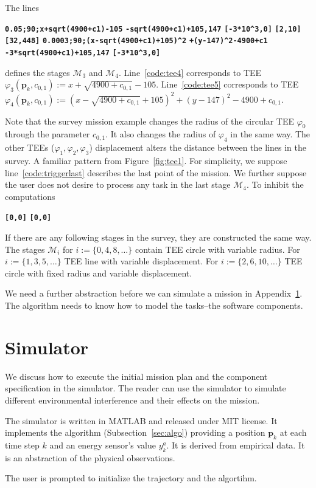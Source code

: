 \documentclass[letterpaper,10pt,conference]{ieeeconf}
\theoremstyle{definition}
\begin{document}
The lines
\begin{algorithmic}[1]
  \State\textbf{\texttt{0.05;90;x+sqrt(4900+c1)-105}}\label{code:tee4}
  \State\textbf{\texttt{-sqrt(4900+c1)+105,147}}
  \State\textbf{\texttt{[-3*10\^{}3,0]}}
  \State\textbf{\texttt{[2,10]}}
  \State\textbf{\texttt{[32,448]}}\label{code:qosset42}
  \State\textbf{\texttt{0.0003;90;(x-sqrt(4900+c1)+105)\^{}2}}
  \textbf{\texttt{\hspace*{14ex}+(y-147)\^{}2-4900+c1}}\label{code:tee5}
  \State\textbf{\texttt{-3*sqrt(4900+c1)+105,147}}\label{code:triggerlast}
  \State\textbf{\texttt{[-3*10\^{}3,0]}}\label{code:teeset5}
\end{algorithmic}
defines the stages $\mathcal{M}_3$ and $\mathcal{M}_4$. Line~\ref{code:tee4} corresponds to TEE $\varphi_3(\mathbf{p}_k,c_{0,1}):=x+\sqrt{4900+c_{0,1}}-105$. Line~\ref{code:tee5} corresponds to TEE $\varphi_4(\mathbf{p}_k,c_{0,1}):=(x-\sqrt{4900+c_{0,1}}+105)^2+(y-147)^2-4900+c_{0,1}$.

Note that the survey mission example changes the radius of the circular TEE $\varphi_0$ through the parameter $c_{0,1}$. It also changes the radius of $\varphi_4$ in the same way. The other TEEs ($\varphi_1,\varphi_2,\varphi_3$) displacement alters the distance between the lines in the survey. A familiar pattern from Figure~\ref{fig:tee1}. For simplicity, we suppose line~\ref{code:triggerlast} describes the last point of the mission. We further suppose the user does not desire to process any task in the last stage $\mathcal{M}_4$. To inhibit the computations
\begin{algorithmic}[1]
  \State\textbf{\texttt{[0,0]}}
  \State\textbf{\texttt{[0,0]}}
\end{algorithmic}

If there are any following stages in the survey, they are constructed the same way. The stages $\mathcal{M}_i$ for $i:=\{0,4,8,\dots\}$ contain TEE circle with variable radius. For $i:=\{1,3,5,\dots\}$ TEE line with variable displacement. For $i:=\{2,6,10,\dots\}$ TEE circle with fixed radius and variable displacement.

We need a further abstraction before we can simulate a mission in Appendix~\ref{app:simulator}. The algorithm needs to know how to model the tasks--the software components.

\section{Simulator}
\label{app:simulator}

We discuss how to execute the initial mission plan and the component specification in the simulator. The reader can use the simulator to simulate different environmental interference and their effects on the mission.

The simulator is written in MATLAB and released under MIT license. It implements the algorithm (Subsection~\ref{sec:algo}) providing a position $\mathbf{p}_k$ at each time step $k$ and an energy sensor's value $y_k^a$. It is derived from empirical data. It is an abstraction of the physical observations. 

The user is prompted to initialize the trajectory and the algortihm.
\end{document}
